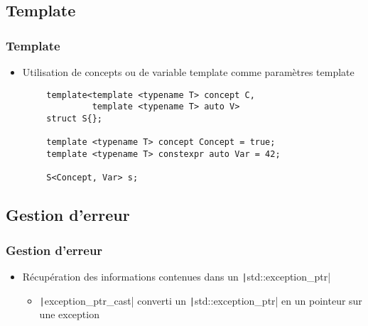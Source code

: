 \documentclass[C++.tex]{subfiles}
\begin{document}
\subsection*{Template}
\begin{frame}[fragile]
	\frametitle{Template}
	\begin{itemize}
		\item Utilisation de concepts ou de variable template comme paramètres template
	\end{itemize}

	\begin{verbatim}
		template<template <typename T> concept C,
		         template <typename T> auto V>
		struct S{};

		template <typename T> concept Concept = true;
		template <typename T> constexpr auto Var = 42;

		S<Concept, Var> s;
	\end{verbatim}

\end{frame}

\subsection*{Gestion d'erreur}
\begin{frame}[fragile]
	\frametitle{Gestion d'erreur}
	\begin{itemize}
		\item Récupération des informations contenues dans un \texttt|std::exception_ptr|
		\begin{itemize}
			\item \texttt|exception_ptr_cast| converti un \texttt|std::exception_ptr| en un pointeur sur une exception
		\end{itemize}
	\end{itemize}

\end{frame}
\end{document}
